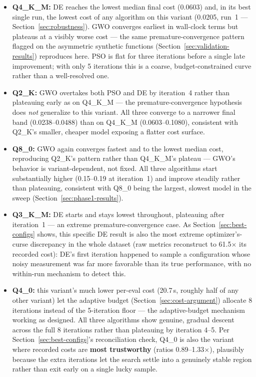 \documentclass[journal]{IEEEtran}
\begin{document}
\begin{itemize}
  \item \textbf{Q4\_K\_M:} DE reaches the lowest median final cost (0.0603) and, in its best single run, the lowest cost of any algorithm on this variant (0.0205, run~1 --- Section~\ref{sec:robustness}). GWO converges earliest in wall-clock terms but plateaus at a visibly worse cost --- the same premature-convergence pattern flagged on the asymmetric synthetic functions (Section~\ref{sec:validation-results}) reproduces here. PSO is flat for three iterations before a single late improvement; with only 5 iterations this is a coarse, budget-constrained curve rather than a well-resolved one.
  \item \textbf{Q2\_K:} GWO overtakes both PSO and DE by iteration~4 rather than plateauing early as on Q4\_K\_M --- the premature-convergence hypothesis does \emph{not} generalize to this variant. All three converge to a narrower final band (0.0238--0.0488) than on Q4\_K\_M (0.0603--0.1080), consistent with Q2\_K's smaller, cheaper model exposing a flatter cost surface.
  \item \textbf{Q8\_0:} GWO again converges fastest and to the lowest median cost, reproducing Q2\_K's pattern rather than Q4\_K\_M's plateau --- GWO's behavior is variant-dependent, not fixed. All three algorithms start substantially higher (0.15--0.19 at iteration~1) and improve steadily rather than plateauing, consistent with Q8\_0 being the largest, slowest model in the sweep (Section~\ref{sec:phase1-results}).
  \item \textbf{Q3\_K\_M:} DE starts and stays lowest throughout, plateauing after iteration~1 --- an extreme premature-convergence case. As Section~\ref{sec:best-configs} shows, this specific DE result is also the most extreme optimizer's-curse discrepancy in the whole dataset (raw metrics reconstruct to 61.5$\times$ its recorded cost): DE's first iteration happened to sample a configuration whose noisy measurement was far more favorable than its true performance, with no within-run mechanism to detect this.
  \item \textbf{Q4\_0:} this variant's much lower per-eval cost (20.7\,s, roughly half of any other variant) let the adaptive budget (Section~\ref{sec:cost-argument}) allocate 8 iterations instead of the 5-iteration floor --- the adaptive-budget mechanism working as designed. All three algorithms show genuine, gradual descent across the full 8 iterations rather than plateauing by iteration 4--5. Per Section~\ref{sec:best-configs}'s reconciliation check, Q4\_0 is also the variant where recorded costs are \textbf{most trustworthy} (ratios 0.89--1.33$\times$), plausibly because the extra iterations let the search settle into a genuinely stable region rather than exit early on a single lucky sample.

\end{itemize}
\end{document}
